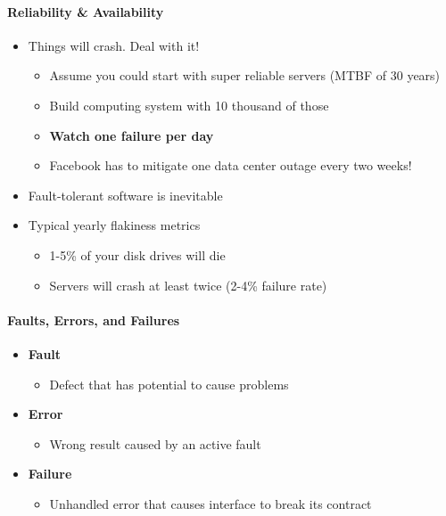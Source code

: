 \paragraph{Reliability \& Availability}
\begin{itemize}
\item Things will crash. Deal with it!
  \begin{itemize}
  \item Assume you could start with super reliable servers
    (MTBF of 30 years)
  \item Build computing system with 10 thousand of those
  \item \textbf{Watch one failure per day}
  \item Facebook has to mitigate one data center outage every
    two weeks!
  \end{itemize}
\end{itemize}

\begin{itemize}
\item {\color{brown} Fault-tolerant software is inevitable}
\end{itemize}

\begin{itemize}
\item Typical yearly flakiness metrics
  \begin{itemize}
  \item 1-5\% of your disk drives will die
  \item Servers will crash at least twice (2-4\% failure rate)
  \end{itemize}
\end{itemize}


\paragraph{Faults, Errors, and Failures}
\begin{itemize}
\item \textbf{Fault}
  \begin{itemize}
  \item Defect that has potential to cause problems
  \end{itemize}

\item \textbf{Error}
  \begin{itemize}
  \item Wrong result caused by an active fault
  \end{itemize}

\item \textbf{Failure}
  \begin{itemize}
  \item Unhandled error that causes interface to break its contract
  \end{itemize}
\end{itemize}

